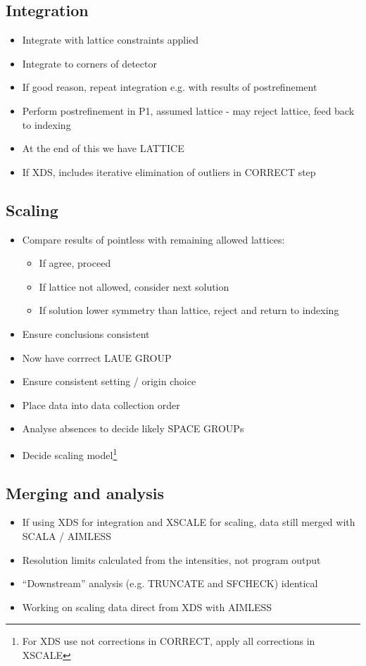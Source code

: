 \documentclass[a4paper, 11pt]{article}
\begin{document}
\subsection{Integration}
\begin{itemize}
\item{Integrate with lattice constraints applied}
\item{Integrate to corners of detector}
\item{If good reason, repeat integration e.g. with results of postrefinement}
\item{Perform postrefinement in P1, assumed lattice - may reject lattice,
feed back to indexing}
\item{At the end of this we have LATTICE}
\item{If XDS, includes iterative elimination of outliers in CORRECT step}
\end{itemize}

\subsection{Scaling}
\begin{itemize}
\item{Compare results of pointless with remaining allowed lattices:
\begin{itemize}
\item{If agree, proceed}
\item{If lattice not allowed, consider next solution}
\item{If solution lower symmetry than lattice, reject and return to indexing}
\end{itemize}
}
\item{Ensure conclusions consistent}
\item{Now have corrrect LAUE GROUP}
\item{Ensure consistent setting / origin choice}
\item{Place data into data collection order}
\item{Analyse absences to decide likely SPACE GROUPs}
\item{Decide scaling model\footnote{For XDS use not corrections in CORRECT,
apply all corrections in XSCALE}}
\end{itemize}

\subsection{Merging and analysis}
\begin{itemize}
\item{If using XDS for integration and XSCALE for scaling, data still merged
with SCALA / AIMLESS}
\item{Resolution limits calculated from the intensities, not program output}
\item{``Downstream'' analysis (e.g. TRUNCATE and SFCHECK) identical}
\item{Working on scaling data direct from XDS with AIMLESS}
\end{itemize}
\end{document}
